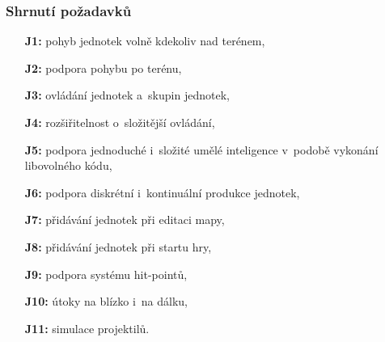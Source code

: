 \subsubsection{Shrnutí požadavků}
\begin{itemize}
	\item[\textbf{J1:}] pohyb jednotek volně kdekoliv nad terénem,
	\item[\textbf{J2:}] podpora pohybu po terénu,
	\item[\textbf{J3:}] ovládání jednotek a~skupin jednotek,
	\item[\textbf{J4:}] rozšiřitelnost o~složitější ovládání,
	\item[\textbf{J5:}] podpora jednoduché i~složité umělé inteligence v~podobě vykonání libovolného kódu,
	\item[\textbf{J6:}] podpora diskrétní i~kontinuální produkce jednotek,
	\item[\textbf{J7:}] přidávání jednotek při editaci mapy,
	\item[\textbf{J8:}] přidávání jednotek při startu hry,
	\item[\textbf{J9:}] podpora systému hit-pointů,
	\item[\textbf{J10:}] útoky na blízko i~na dálku,
	\item[\textbf{J11:}] simulace projektilů.
\end{itemize}

\done
{}
